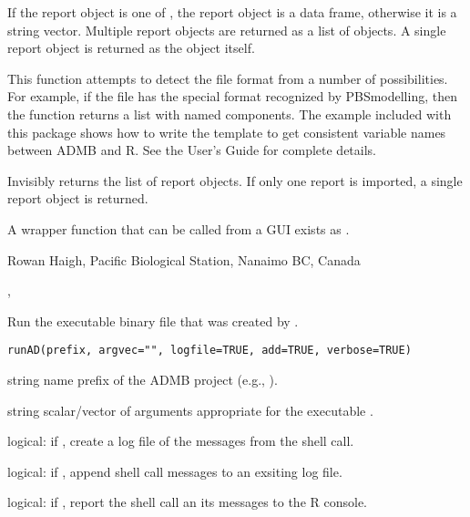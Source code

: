 \documentclass[letterpaper]{book}
\begin{document}
%
\begin{Details}\relax
If the report object is one of , the
report object is a data frame, otherwise it is a string vector. Multiple 
report objects are returned as a list of objects. A single report object is 
returned as the object itself.

This function attempts to detect the file format from a number of possibilities.
For example, if the file has the special format recognized by PBSmodelling,
then the function returns a list with named components. The example 
included with this package shows how to write the template to get consistent
variable names between ADMB and R. See the User's Guide for complete details.
\end{Details}
%
\begin{Value}
Invisibly returns the list of report objects. If only one report is 
imported, a single report object is returned.
\end{Value}
%
\begin{Note}\relax
A wrapper function that can be called from a GUI exists as .
\end{Note}
%
\begin{Author}\relax
 Rowan Haigh, Pacific Biological Station, Nanaimo BC, Canada 
\end{Author}
%
\begin{SeeAlso}\relax
{}, 
\end{SeeAlso}
%
\begin{Description}\relax
Run the executable binary file  that was created by 
.
\end{Description}
%
\begin{Usage}
\begin{verbatim}
runAD(prefix, argvec="", logfile=TRUE, add=TRUE, verbose=TRUE)
\end{verbatim}
\end{Usage}
%
\begin{Arguments}
\begin{ldescription}
\item[\code{prefix}] string name prefix of the ADMB project (e.g., ).
\item[\code{argvec}] string scalar/vector of arguments appropriate for the executable
.
\item[\code{logfile}] logical: if , create a log file of the messages from the shell call.
\item[\code{add}] logical: if , append shell call messages to an exsiting log file.
\item[\code{verbose}] logical: if , report the shell call an its messages to the R console.
\end{ldescription}
\end{Arguments}
\end{document}
